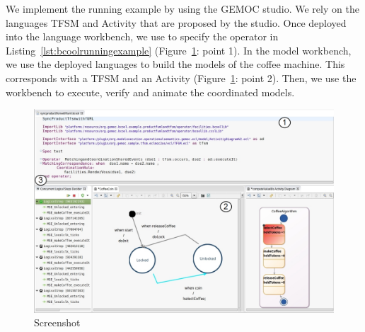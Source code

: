 We implement the running example by using the GEMOC studio. We rely on the languages TFSM and Activity that are proposed by the studio. Once deployed into the language workbench, we use \bcool to specify the operator in Listing~\ref{lst:bcoolrunningexample} (Figure~\ref{fig:screenbcool}: point 1). In the model workbench, we use the deployed languages to build the models of the coffee machine. This corresponds with a TFSM and an Activity (Figure~\ref{fig:screenbcool}: point 2). Then, we use the workbench to execute, verify and animate the coordinated models.   

\begin{figure}[h]
	\begin{center}
		\includegraphics[width=.6\textwidth]{bcool/figs/bcoolscreen.png}
		\caption{Screenshot}
		\label{fig:screenbcool}
	\end{center}
\end{figure}

  

